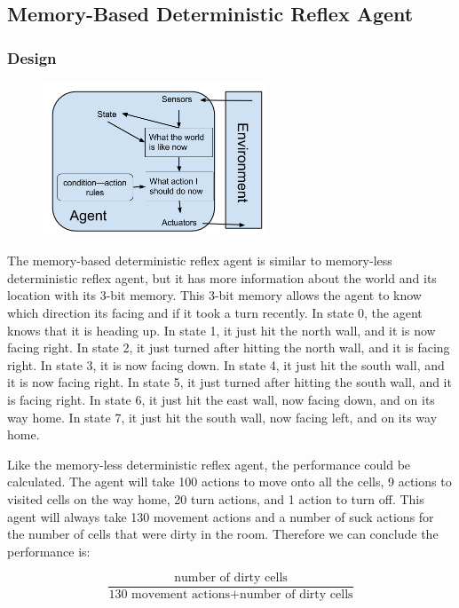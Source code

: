 \documentclass[a4paper,10pt]{article}
\begin{document}
\subsection{Memory-Based Deterministic Reflex Agent}
\subsubsection{Design}
\begin{figure}[H]
	\begin{center}
		\includegraphics[width=0.6\textwidth]{MemoryReflex.png}
	\end{center}
\end{figure}

The memory-based deterministic reflex agent is similar to memory-less deterministic reflex agent, but it has more information about the world and its location with its 3-bit memory. 
This 3-bit memory allows the agent to know which direction its facing and if it took a turn recently.
In state 0, the agent knows that it is heading up.
In state 1, it just hit the north wall, and it is now facing right.
In state 2, it just turned after hitting the north wall, and it is facing right.
In state 3, it is now facing down. 
In state 4, it just hit the south wall, and it is now facing right.
In state 5, it just turned after hitting the south wall, and it is facing right.
In state 6, it just hit the east wall, now facing down, and on its way home.
In state 7, it just hit the south wall, now facing left, and on its way home.

Like the memory-less deterministic reflex agent, the performance could be calculated.
The agent will take 100 actions to move onto all the cells, 9 actions to visited cells on the way home, 20 turn actions, and 1 action to turn off. 
This agent will always take 130 movement actions and a number of suck actions for the number of cells that were dirty in the room. 
Therefore we can conclude the performance is:

\[\frac{\mbox{number of dirty cells}}{\mbox{130 movement actions} + \mbox{number of dirty cells}}\] 
\end{document}
